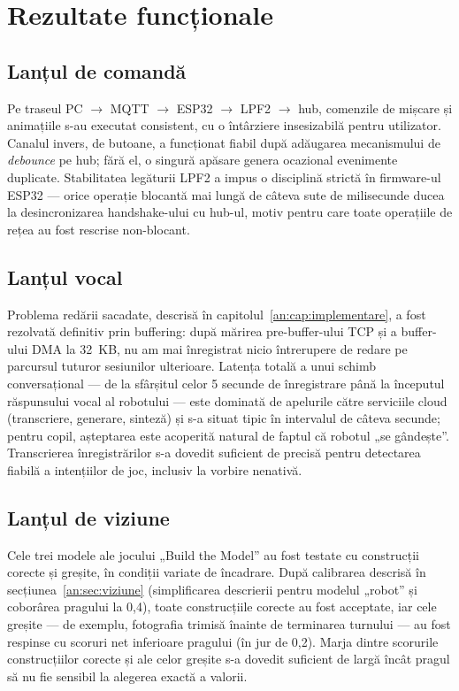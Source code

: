 \section{Rezultate funcționale}

\subsection{Lanțul de comandă}

Pe traseul PC $\rightarrow$ MQTT $\rightarrow$ ESP32 $\rightarrow$ LPF2 $\rightarrow$ hub, comenzile de mișcare și animațiile s-au executat consistent, cu o întârziere insesizabilă pentru utilizator. Canalul invers, de butoane, a funcționat fiabil după adăugarea mecanismului de \emph{debounce} pe hub; fără el, o singură apăsare genera ocazional evenimente duplicate. Stabilitatea legăturii LPF2 a impus o disciplină strictă în firmware-ul ESP32 — orice operație blocantă mai lungă de câteva sute de milisecunde ducea la desincronizarea handshake-ului cu hub-ul, motiv pentru care toate operațiile de rețea au fost rescrise non-blocant.

\subsection{Lanțul vocal}

Problema redării sacadate, descrisă în capitolul~\ref{an:cap:implementare}, a fost rezolvată definitiv prin buffering: după mărirea pre-buffer-ului TCP și a buffer-ului DMA la 32~KB, nu am mai înregistrat nicio întrerupere de redare pe parcursul tuturor sesiunilor ulterioare. Latența totală a unui schimb conversațional — de la sfârșitul celor 5 secunde de înregistrare până la începutul răspunsului vocal al robotului — este dominată de apelurile către serviciile cloud (transcriere, generare, sinteză) și s-a situat tipic în intervalul de câteva secunde; pentru copil, așteptarea este acoperită natural de faptul că robotul „se gândește”. Transcrierea înregistrărilor s-a dovedit suficient de precisă pentru detectarea fiabilă a intențiilor de joc, inclusiv la vorbire nenativă.

\subsection{Lanțul de viziune}

Cele trei modele ale jocului „Build the Model” au fost testate cu construcții corecte și greșite, în condiții variate de încadrare. După calibrarea descrisă în secțiunea~\ref{an:sec:viziune} (simplificarea descrierii pentru modelul „robot” și coborârea pragului la 0,4), toate construcțiile corecte au fost acceptate, iar cele greșite — de exemplu, fotografia trimisă înainte de terminarea turnului — au fost respinse cu scoruri net inferioare pragului (în jur de 0,2). Marja dintre scorurile construcțiilor corecte și ale celor greșite s-a dovedit suficient de largă încât pragul să nu fie sensibil la alegerea exactă a valorii.


